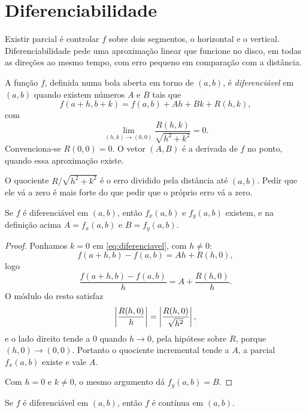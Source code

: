 \documentclass[11pt,a4paper]{article}
\begin{document}
\section{Diferenciabilidade}

Existir parcial é controlar $f$ sobre dois segmentos, o horizontal e o vertical. Diferenciabilidade pede uma aproximação linear que funcione no disco, em todas as direções ao mesmo tempo, com erro pequeno em comparação com a distância.

\begin{definicao}
A função $f$, definida numa bola aberta em torno de $(a,b)$, é \emph{diferenciável} em $(a,b)$ quando existem números $A$ e $B$ tais que
\begin{equation}
f(a+h,b+k)=f(a,b)+Ah+Bk+R(h,k),
\label{eq:diferenciavel}
\end{equation}
com
\[
\lim_{(h,k)\to(0,0)}\frac{R(h,k)}{\sqrt{h^2+k^2}}=0.
\]
Convenciona-se $R(0,0)=0$. O vetor $(A,B)$ é a derivada de $f$ no ponto, quando essa aproximação existe.
\end{definicao}

O quociente $R/\sqrt{h^2+k^2}$ é o erro dividido pela distância até $(a,b)$. Pedir que ele vá a zero é mais forte do que pedir que o próprio erro vá a zero.

\begin{teorema}
Se $f$ é diferenciável em $(a,b)$, então $f_x(a,b)$ e $f_y(a,b)$ existem, e na definição acima $A=f_x(a,b)$ e $B=f_y(a,b)$.
\end{teorema}

\begin{proof}
Ponhamos $k=0$ em \eqref{eq:diferenciavel}, com $h\neq 0$:
\[
f(a+h,b)-f(a,b)=Ah+R(h,0),
\]
logo
\[
\frac{f(a+h,b)-f(a,b)}{h}=A+\frac{R(h,0)}{h}.
\]
O módulo do resto satisfaz
\[
\left\lvert \frac{R(h,0)}{h} \right\rvert=\left\lvert \frac{R(h,0)}{\sqrt{h^2}} \right\rvert,
\]
e o lado direito tende a $0$ quando $h\to 0$, pela hipótese sobre $R$, porque $(h,0)\to(0,0)$. Portanto o quociente incremental tende a $A$, a parcial $f_x(a,b)$ existe e vale $A$.

Com $h=0$ e $k\neq 0$, o mesmo argumento dá $f_y(a,b)=B$.
\end{proof}

\begin{teorema}
Se $f$ é diferenciável em $(a,b)$, então $f$ é contínua em $(a,b)$.
\end{teorema}
\end{document}
